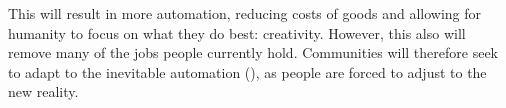 This will result in more automation, reducing costs of goods and allowing for humanity to focus on what they do best: creativity. However, this also will remove many of the jobs people currently hold. Communities will therefore seek to adapt to the inevitable automation (\cite{UnionsAutomation}), as people are forced to adjust to the new reality.